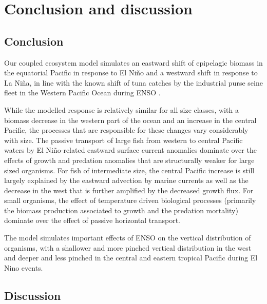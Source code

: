 \section{Conclusion and discussion}
\label{sec:conclusion}


\subsection{Conclusion}

Our coupled ecosystem model simulates an eastward shift of epipelagic biomass in the equatorial Pacific in response to El Niño  and a westward shift in response to La Niña,    in line with the known shift of tuna catches by the industrial purse seine fleet in the Western Pacific Ocean during ENSO \citep{lehodeyNinoSouthernOscillation1997}.

While the modelled response is relatively similar for all size classes, with a biomass decrease in the western part of the ocean and an increase in the central Pacific, the processes that are responsible for these changes vary considerably with size. The passive transport of large fish from western to central Pacific waters by El Niño-related eastward surface current anomalies dominate over the effects of growth and predation anomalies that are structurally weaker for large sized organisms. For fish of intermediate size, the central Pacific increase is still largely explained by the eastward advection by marine currents as well as the decrease in the west that is further amplified by the decreased growth flux. For small organisms, the effect of temperature driven biological processes (primarily the biomass production associated to growth and the predation mortality) dominate over the effect of passive horizontal transport.

The model simulates important effects of ENSO on the vertical distribution of organisms, with a shallower and more pinched vertical distribution in the west and deeper and less pinched in the central and eastern tropical Pacific during El Nino events.

\subsection{Discussion}

